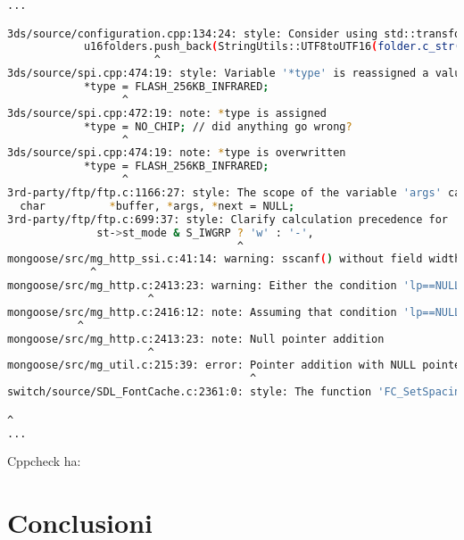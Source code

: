 \documentclass{article}
\begin{document}
\begin{lstlisting}[language=bash]
...

3ds/source/configuration.cpp:134:24: style: Consider using std::transform algorithm instead of a raw loop. [useStlAlgorithm]
            u16folders.push_back(StringUtils::UTF8toUTF16(folder.c_str()));
                       ^
3ds/source/spi.cpp:474:19: style: Variable '*type' is reassigned a value before the old one has been used. [redundantAssignment]
            *type = FLASH_256KB_INFRARED;
                  ^
3ds/source/spi.cpp:472:19: note: *type is assigned
            *type = NO_CHIP; // did anything go wrong?
                  ^
3ds/source/spi.cpp:474:19: note: *type is overwritten
            *type = FLASH_256KB_INFRARED;
                  ^
3rd-party/ftp/ftp.c:1166:27: style: The scope of the variable 'args' can be reduced. [variableScope]
  char          *buffer, *args, *next = NULL;
3rd-party/ftp/ftp.c:699:37: style: Clarify calculation precedence for '&' and '?'. [clarifyCalculation]
              st->st_mode & S_IWGRP ? 'w' : '-',
                                    ^
mongoose/src/mg_http_ssi.c:41:14: warning: sscanf() without field width limits can crash with huge input data. [invalidscanf]
             ^
mongoose/src/mg_http.c:2413:23: warning: Either the condition 'lp==NULL' is redundant or there is pointer arithmetic with NULL pointer. [nullPointerArithmeticRedundantCheck]
                      ^
mongoose/src/mg_http.c:2416:12: note: Assuming that condition 'lp==NULL' is not redundant
           ^
mongoose/src/mg_http.c:2413:23: note: Null pointer addition
                      ^
mongoose/src/mg_util.c:215:39: error: Pointer addition with NULL pointer. [nullPointerArithmetic]
                                      ^
switch/source/SDL_FontCache.c:2361:0: style: The function 'FC_SetSpacing' is never used. [unusedFunction]

^
...
\end{lstlisting}

Cppcheck ha:



\section{Conclusioni}
\end{document}
